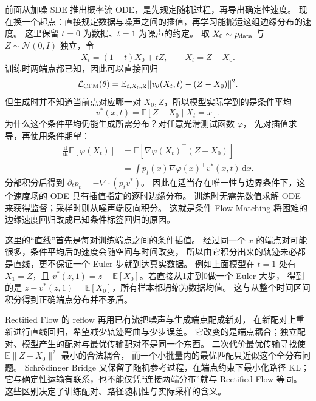 前面从加噪 SDE 推出概率流 ODE，是先规定随机过程，再导出确定性速度。
现在换一个起点：直接规定数据与噪声之间的插值，再学习能搬运这组边缘分布的速度。
这里保留 $t=0$ 为数据、$t=1$ 为噪声的约定。
取 $X_0\sim p_{\rm data}$ 与 $Z\sim\mathcal N(0,I)$ 独立，令
\[
X_t=(1-t)X_0+tZ,\qquad \dot X_t=Z-X_0.
\]
训练时两端点都已知，因此可以直接回归
\[
\mathcal L_{\rm CFM}(\theta)=
 \mathbb E_{t,X_0,Z}\|v_\theta(X_t,t)-(Z-X_0)\|^2.
\]
但生成时并不知道当前点对应哪一对 $X_0,Z$，所以模型实际学到的是条件平均
\[
v^*(x,t)=\mathbb E[Z-X_0\mid X_t=x].
\]
为什么这个条件平均仍能生成所需分布？对任意光滑测试函数 $\varphi$，
先对插值求导，再使用条件期望：
\begin{align}
\frac{\mathrm d}{\mathrm dt}\mathbb E[\varphi(X_t)]
 &=\mathbb E[\nabla\varphi(X_t)^\top(Z-X_0)]\\
 &=\int p_t(x)\nabla\varphi(x)^\top v^*(x,t)\,\mathrm dx.
\end{align}
分部积分后得到 $\partial_tp_t=-\nabla\cdot(p_tv^*)$。
因此在适当存在唯一性与边界条件下，这个速度场的 ODE 具有插值指定的逐时边缘分布。
训练时无需先数值求解 ODE 来获得监督；采样时则从噪声端反向积分。
这就是条件 Flow Matching 将困难的边缘速度回归改成已知条件标签回归的原因。
\cite{fm,rf,flow-guide}

这里的“直线”首先是每对训练端点之间的条件插值。
经过同一个 $x$ 的端点对可能很多，条件平均后的速度会随空间与时间改变，
所以由它积分出来的轨迹未必都是直线，更不保证一个 Euler 步就到达真实数据。
例如上面模型在 $t=1$ 处有 $X_1=Z$，且
$v^*(z,1)=z-\mathbb E[X_0]$。若直接从1走到0做一个 Euler 大步，
得到的是 $z-v^*(z,1)=\mathbb E[X_0]$，所有样本都坍缩为数据均值。
这与从整个时间区间积分得到正确端点分布并不矛盾。

Rectified Flow 的 reflow 再用已有流把噪声与生成端点配成新对，
在新配对上重新进行直线回归，希望减少轨迹弯曲与少步误差。
它改变的是端点耦合；独立配对、模型产生的配对与最优传输配对不是同一个东西。
二次代价最优传输寻找使 $\mathbb E\|Z-X_0\|^2$ 最小的合法耦合，
而一个小批量内的最优匹配只近似这个全分布问题。
Schrödinger Bridge 又保留了随机参考过程，在端点约束下最小化路径 KL；
它与确定性运输有联系，也不能仅凭“连接两端分布”就与 Rectified Flow 等同。
这些区别决定了训练配对、路径随机性与实际采样的含义。\cite{theorybook}
